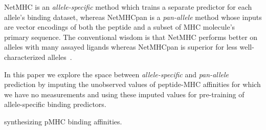NetMHC is an {\it allele-specific} method which trains a separate predictor for each allele's binding dataset, whereas NetMHCpan is a {\it pan-allele} method whose inputs are vector encodings of both the peptide and a subset of MHC molecule's primary sequence. The conventional wisdom is that NetMHC performs better on alleles with many assayed ligands whereas NetMHCpan is superior for less well-characterized alleles~\cite{Gfeller_2016}.

In this paper we explore the space between {\it allele-specific} and {\it pan-allele} prediction by imputing the unobserved values of peptide-MHC affinities for which we have no measurements and using these imputed values for pre-training of allele-specific binding predictors.

synthesizing pMHC binding affinities.
